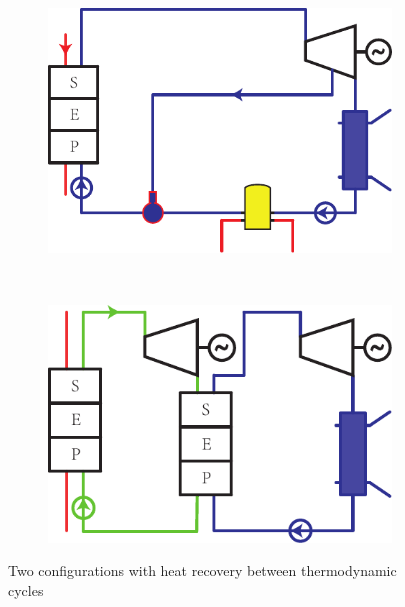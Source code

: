 \noindent \begin{figure}[htbp]
\centering
	\begin{subfigure}[b]{0.4\columnwidth}
	\includegraphics[width = \columnwidth]{fig/Stirling-Rankine}
	\caption{}\label{fig:Stirling-Rankine}
	\end{subfigure}
	~
\begin{subfigure}[b]{0.4\columnwidth}
	\includegraphics[width = \columnwidth]{fig/SeriesRankine}
	\caption{}\label{fig:Rankine-Rankine}
	\end{subfigure}
	\caption{Two configurations with heat recovery between thermodynamic cycles}
	\label{fig:coupledCycles}
\end{figure}

